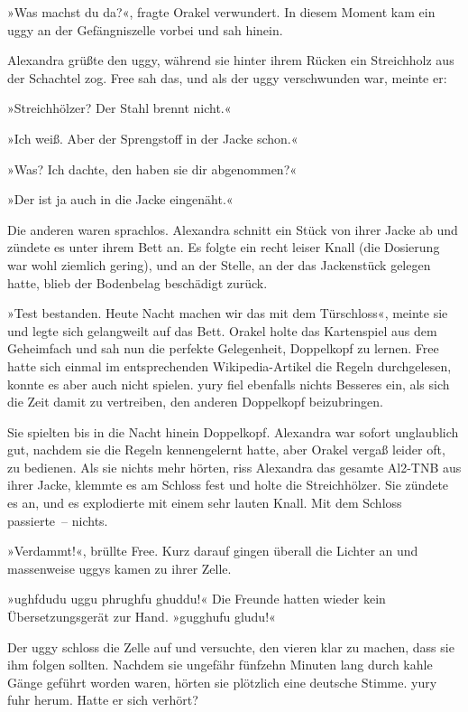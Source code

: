 »Was machst du da?«, fragte Orakel verwundert. In diesem Moment kam ein uggy an der Gefängniszelle vorbei und sah hinein.

Alexandra grüßte den uggy, während sie hinter ihrem Rücken ein Streichholz aus der Schachtel zog. Free sah das, und als der uggy verschwunden war, meinte er:

»Streichhölzer? Der Stahl brennt nicht.«

»Ich weiß. Aber der Sprengstoff in der Jacke schon.«

»Was? Ich dachte, den haben sie dir abgenommen?«

»Der ist ja auch in die Jacke eingenäht.«

Die anderen waren sprachlos. Alexandra schnitt ein Stück von ihrer Jacke ab und zündete es unter ihrem Bett an. Es folgte ein recht leiser Knall (die Dosierung war wohl ziemlich gering), und an der Stelle, an der das Jackenstück gelegen hatte, blieb der Bodenbelag beschädigt zurück.

»Test bestanden. Heute Nacht machen wir das mit dem Türschloss«, meinte sie und legte sich gelangweilt auf das Bett. Orakel holte das Kartenspiel aus dem Geheimfach und sah nun die perfekte Gelegenheit, Doppelkopf zu lernen. Free hatte sich einmal im entsprechenden Wikipedia-Artikel die Regeln durchgelesen, konnte es aber auch nicht spielen. yury fiel ebenfalls nichts Besseres ein, als sich die Zeit damit zu vertreiben, den anderen Doppelkopf beizubringen.

Sie spielten bis in die Nacht hinein Doppelkopf. Alexandra war sofort unglaublich gut, nachdem sie die Regeln kennengelernt hatte, aber Orakel vergaß leider oft, zu bedienen. Als sie nichts mehr hörten, riss Alexandra das gesamte Al2-TNB aus ihrer Jacke, klemmte es am Schloss fest und holte die Streichhölzer. Sie zündete es an, und es explodierte mit einem sehr lauten Knall. Mit dem Schloss passierte~– nichts.

»Verdammt!«, brüllte Free. Kurz darauf gingen überall die Lichter an und massenweise uggys kamen zu ihrer Zelle.

»ughfdudu uggu phrughfu ghuddu!« Die Freunde hatten wieder kein Übersetzungsgerät zur Hand. »gugghufu gludu!«

Der uggy schloss die Zelle auf und versuchte, den vieren klar zu machen, dass sie ihm folgen sollten. Nachdem sie ungefähr fünfzehn Minuten lang durch kahle Gänge geführt worden waren, hörten sie plötzlich eine deutsche Stimme. yury fuhr herum. Hatte er sich verhört?

